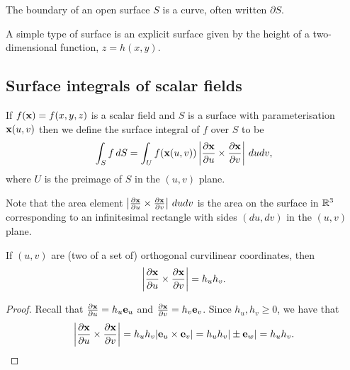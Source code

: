 \documentclass[10pt, a4paper]{article}
\begin{document}
\begin{definition}[Boundary]
    The boundary of an open surface $S$ is a curve,
    often written $\partial S$.
\end{definition}

A simple type of surface is an explicit surface given by the height of a two-dimensional function,
$z = h(x, y)$.

\subsection{Surface integrals of scalar fields}

If $f(\mathbf{x}) = f(x, y, z)$ is a scalar field and $S$ is a surface with parameterisation $\mathbf{x}(u, v)$ then we define the surface integral of $f$ over $S$ to be
\[
\int_{S}f\,dS = \int_{U}f(\mathbf{x}(u, v))\left|\frac{\partial\mathbf{x}}{\partial u} \times \frac{\partial \mathbf{x}}{\partial v}\right|\,dudv,
\]
where $U$ is the preimage of $S$ in the $(u, v)$ plane.

Note that the area element $\left|\frac{\partial\mathbf{x}}{\partial u} \times \frac{\partial \mathbf{x}}{\partial v}\right|\,dudv$ is the area on the surface in $\mathbb{R} ^ 3$ corresponding to an infinitesimal rectangle with sides $(du, dv)$ in the $(u, v)$ plane.


\begin{proposition}
    If $(u, v)$ are
    (two of a set of)
    orthogonal curvilinear coordinates,
    then
    \[
    \left|\frac{\partial\mathbf{x}}{\partial u} \times \frac{\partial \mathbf{x}}{\partial v}\right| = h_uh_v.
    \]

    \begin{proof}
        Recall that $\frac{\partial\mathbf{x}}{\partial u} = h_u\mathbf{e}_u$ and $\frac{\partial\mathbf{x}}{\partial v} = h_v\mathbf{e}_v$.
        Since $h_u, h_v \geq 0$,
        we have that
        \[
        \left|\frac{\partial\mathbf{x}}{\partial u} \times \frac{\partial \mathbf{x}}{\partial v}\right| = h_uh_v|\mathbf{e}_u \times \mathbf{e}_v| = h_uh_v|\pm\mathbf{e}_w| = h_uh_v.
        \]
    \end{proof}
\end{proposition}
\end{document}
